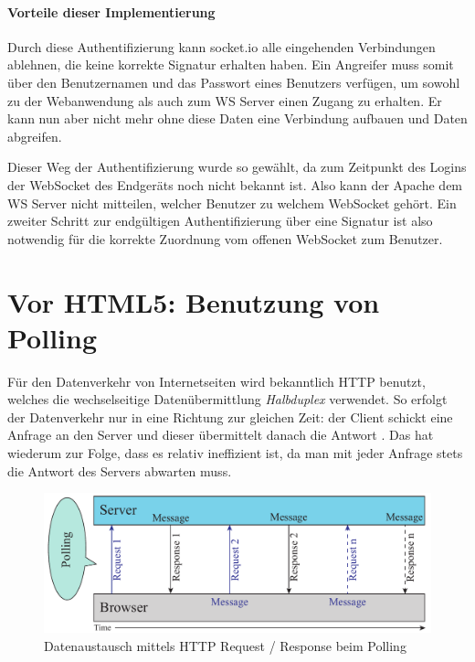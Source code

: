 \paragraph{Vorteile dieser Implementierung}
Durch diese Authentifizierung kann socket.io alle eingehenden Verbindungen ablehnen, die keine korrekte Signatur erhalten haben. Ein Angreifer muss somit über den Benutzernamen und das Passwort eines Benutzers verfügen, um sowohl zu der Webanwendung als auch zum WS Server einen Zugang zu erhalten. Er kann nun aber nicht mehr ohne diese Daten eine Verbindung aufbauen und Daten abgreifen.\par

Dieser Weg der Authentifizierung wurde so gewählt, da zum Zeitpunkt des Logins der WebSocket des Endgeräts noch nicht bekannt ist. Also kann der Apache dem WS Server nicht mitteilen, welcher Benutzer zu welchem WebSocket gehört. Ein zweiter Schritt zur endgültigen Authentifizierung über eine Signatur ist also notwendig für die korrekte Zuordnung vom offenen WebSocket zum Benutzer. 


\section{Vor HTML5: Benutzung von Polling}
Für den Datenverkehr von Internetseiten wird bekanntlich HTTP benutzt, welches die wechselseitige Datenübermittlung \emph{Halbduplex} verwendet. So erfolgt der Datenverkehr nur in eine Richtung zur gleichen Zeit: der Client schickt eine Anfrage an den Server und dieser übermittelt danach die Antwort \cite[S. 5]{ws}. Das hat wiederum zur Folge, dass es relativ ineffizient ist, da man mit jeder Anfrage stets die Antwort des Servers abwarten muss.\par

\begin{figure}[!ht]
	\centering
	\includegraphics[width=15cm]{fig/polling}
	\caption[Datenaustausch beim Polling]{Datenaustausch mittels HTTP Request / Response beim Polling {\cite[S. 7]{ws}}}
\end{figure}

